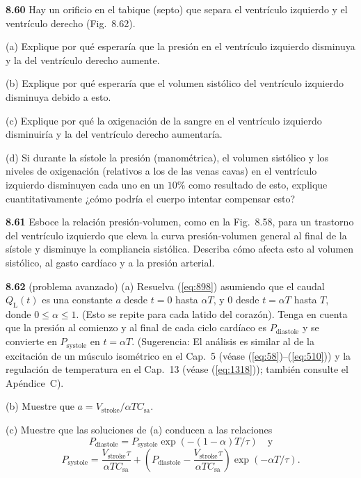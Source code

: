 \documentclass[12pt]{book}
\begin{document}
\textbf{8.60} Hay un orificio en el tabique (septo) que separa el ventrículo izquierdo y el ventrículo derecho (Fig.~8.62).

(a) Explique por qué esperaría que la presión en el ventrículo izquierdo disminuya y la del ventrículo derecho aumente.

(b) Explique por qué esperaría que el volumen sistólico del ventrículo izquierdo disminuya debido a esto.

(c) Explique por qué la oxigenación de la sangre en el ventrículo izquierdo disminuiría y la del ventrículo derecho aumentaría.

(d) Si durante la sístole la presión (manométrica), el volumen sistólico y los niveles de oxigenación (relativos a los de las venas cavas) en el ventrículo izquierdo disminuyen cada uno en un $10\%$ como resultado de esto, explique cuantitativamente ¿cómo podría el cuerpo intentar compensar esto?

\textbf{8.61} Esboce la relación presión-volumen, como en la Fig.~8.58, para un trastorno del ventrículo izquierdo que eleva la curva presión-volumen general al final de la sístole y disminuye la compliancia sistólica. Describa cómo afecta esto al volumen sistólico, al gasto cardíaco y a la presión arterial.

\textbf{8.62} (problema avanzado)
(a) Resuelva (\ref{eq:898}) asumiendo que el caudal $Q_{\text{L}}(t)$ es una constante $a$ desde $t = 0$ hasta $\alpha T$, y $0$ desde $t = \alpha T$ hasta $T$, donde $0 \le \alpha \le 1$. (Esto se repite para cada latido del corazón). Tenga en cuenta que la presión al comienzo y al final de cada ciclo cardíaco es $P_{\text{diastole}}$ y se convierte en $P_{\text{systole}}$ en $t = \alpha T$. (Sugerencia: El análisis es similar al de la excitación de un músculo isométrico en el Cap.~5 (véase (\ref{eq:58})--(\ref{eq:510})) y la regulación de temperatura en el Cap.~13 (véase (\ref{eq:1318})); también consulte el Apéndice~C).

(b) Muestre que $a = V_{\text{stroke}}/\alpha T C_{\text{sa}}$.

(c) Muestre que las soluciones de (a) conducen a las relaciones
\begin{equation}
P_{\text{diastole}} = P_{\text{systole}} \exp(-(1 - \alpha)T/\tau) \quad \text{y}
\label{eq:8132}
\end{equation}
\begin{equation}
P_{\text{systole}} = \frac{V_{\text{stroke}} \tau}{\alpha T C_{\text{sa}}} + \left( P_{\text{diastole}} - \frac{V_{\text{stroke}} \tau}{\alpha T C_{\text{sa}}} \right) \exp(-\alpha T/\tau).
\label{eq:8133}
\end{equation}
\end{document}
